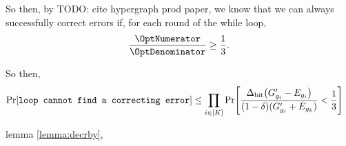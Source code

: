 So then, by TODO: cite hypergraph prod paper, we know that we can always successfully
correct errors if, for each round of the while loop,
$$
	\frac{\OptNumerator}{\OptDenominator}	\geq \frac{1}{3}.
$$

\newcommand{\OptVarRV}{Q}
\newcommand{\OptVarEq}{
\frac
			{\DegBit \mleft(\genscoreRVCorrected_{g_i} - \lyingGenerator_{g_i}\mright)}
			{(1 - \delta)(\genscoreRVCorrected_{g_i} + \lyingGenerator_{g_k})}
}
So then, \begin{align*}
	\Pr\mleft[\texttt{loop cannot find a correcting error}\mright] &\leq
		\prod_{i \in [K]} \Pr\mleft[\OptVarEq < \frac{1}{3} \mright]
\end{align*}



 lemma \ref{lemma:decrby}, 


